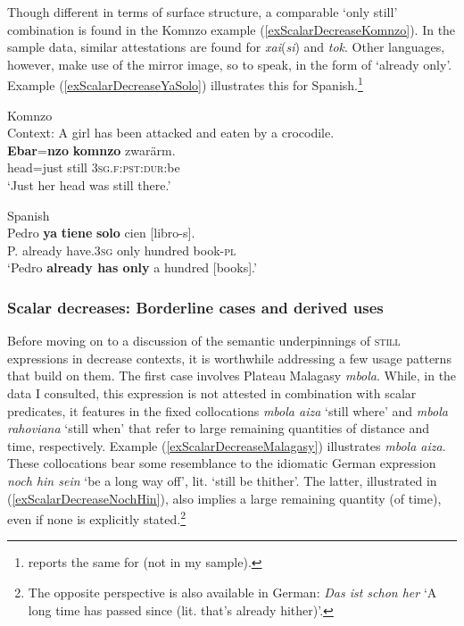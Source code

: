 Though different in terms of surface structure, a comparable \lq only still\rq{ }combination is found in the Komnzo example (\ref{exScalarDecreaseKomnzo}). In the sample data, similar attestations are found for  \mbox{\textit{xai}(\textit{si})} and  \textit{tok}. Other languages, however, make use of the mirror image, so to speak, in the form of \lq already only\rq{}. Example (\ref{exScalarDecreaseYaSolo}) illustrates this for Spanish.\footnote{\Textcite{vanderAuwera1993} reports the same for  (not in my sample).}
\begin{exe}
	 \ex Komnzo\label{exScalarDecreaseKomnzo}\\
	 Context: A girl has been attacked and eaten by a crocodile.\\
	 \gll \textbf{Ebar}=\textbf{nzo} \textbf{komnzo} zwarärm.\\
	head=just still 3\textsc{sg}.\textsc{f}:\textsc{pst}:\textsc{dur}:be\\
	\glt \lq Just her head was still there.' \parencite{Doehler2020}
 
	\ex Spanish\label{exScalarDecreaseYaSolo}\\
	\gll Pedro \textbf{ya} \textbf{tiene} \textbf{solo} cien \textup{[}libro-s\textup{]}.\\
	P. already have.3\textsc{sg} only hundred \phantom{[}book-\textsc{pl}\\
	\glt \lq Pedro \textbf{already has only} a hundred [books].\rq{ }\parencite[384]{Garrido1992}
\end{exe}

\subsubsection{Scalar decreases: Borderline cases and derived uses}
Before moving on to a discussion of the semantic underpinnings of \textsc{still} expressions in decrease contexts, it is worthwhile addressing a few usage patterns that build on them. The first case involves Plateau Malagasy \textit{mbola}. While, in the data I consulted, this expression is not attested in combination with scalar predicates, it features in the  fixed collocations \textit{mbola aiza} \lq still where\rq{ }and \textit{mbola rahoviana} \lq still when\rq{ }that refer to large remaining quantities of distance and time, respectively. Example (\ref{exScalarDecreaseMalagasy}) illustrates \textit{mbola aiza}. These collocations bear some resemblance to the idiomatic German expression \textit{noch hin sein} \lq be a long way off\rq{}, lit. \lq{}still be thither\rq{}. The latter, illustrated in (\ref{exScalarDecreaseNochHin}), also implies a large remaining quantity (of time), even if none is explicitly stated.\footnote{The opposite perspective is also available in German: \textit{Das ist schon her} \lq A long time has passed since (lit. that's already hither)\rq{}.}

